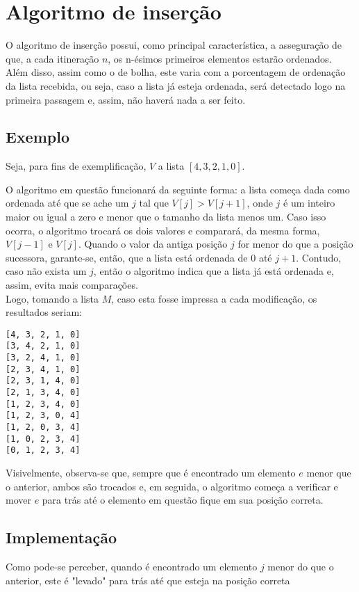 \section{Algoritmo de inserção}
O algoritmo de inserção possui, como principal característica, a asseguração de que, a cada itineração $n$, os n-ésimos primeiros elementos estarão ordenados. Além disso, assim como o de bolha, este varia com a porcentagem de ordenação da lista recebida, ou seja, caso a lista já esteja ordenada, será detectado logo na primeira passagem e, assim, não haverá nada a ser feito. 


\subsection{Exemplo}
Seja, para fins de exemplificação, $V$ a lista $[4,3,2,1,0]$.  

O algoritmo em questão funcionará da seguinte forma: a lista começa dada como ordenada até que se ache um $j$ tal que $V[j]>V[j+1]$, onde $j$ é um inteiro maior ou igual a zero e menor que o tamanho da lista menos um. 
Caso isso ocorra, o algoritmo trocará os dois valores e comparará, da mesma forma, $V[j-1]$ e $V[j]$. Quando o valor da antiga posição $j$ for menor do que a posição sucessora, garante-se, então, que a lista está ordenada de 0 até $j+1$. Contudo, caso não exista um $j$, então o algoritmo indica que a lista já está ordenada e, assim, evita mais comparações.
\\

Logo, tomando a lista $M$, caso esta fosse impressa a cada modificação, os resultados seriam:
\begin{lstlisting}
[4, 3, 2, 1, 0]
[3, 4, 2, 1, 0]
[3, 2, 4, 1, 0]
[2, 3, 4, 1, 0]
[2, 3, 1, 4, 0]
[2, 1, 3, 4, 0]
[1, 2, 3, 4, 0]
[1, 2, 3, 0, 4]
[1, 2, 0, 3, 4]
[1, 0, 2, 3, 4]
[0, 1, 2, 3, 4]
\end{lstlisting}

Visivelmente, observa-se que, sempre que é encontrado um elemento $e$ menor que o anterior, ambos são trocados e, em seguida, o algoritmo começa a verificar e mover $e$ para trás até o elemento em questão fique em sua posição correta.
\newpage

\subsection{Implementação}
Como pode-se perceber, quando é encontrado um elemento $j$ menor do que o anterior, este é "levado" para trás até que esteja na posição correta

